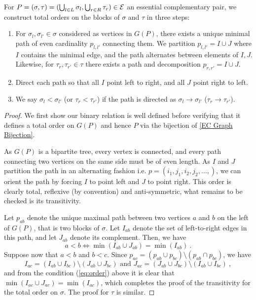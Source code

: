 \begin{construction} 
\label{Order Lemma}
For $P=(\sigma,\tau) = (\bigcup_{l\in L}\sigma_l,\bigcup_{r\in R} \tau_r) \in \mathcal{E}$ an essential complementary pair, we construct total orders on the blocks of $\sigma$ and $\tau$ in three steps:
\begin{enumerate}
    \item For $\sigma_l,\sigma_{l'} \in \sigma$ considered as vertices in $G(P)$, there exists a unique minimal path of even cardinality $p_{l,l'}$ connecting them.
    We partition $p_{l,l'}=I\cup J$ where $I$ contains the minimal edge, and the path alternates between elements of $I,J$. Likewise, for $\tau_r,\tau_{r'}\in \tau$ there exists a path and decomposition $p_{r,r'} = I\cup J$.
    \item Direct each path so that all $I$ point left to right, and all $J$ point right to left.
    \item We say $\sigma_l< \sigma_{l'}$ (or $\tau_r < \tau_{r'}$) if the path is directed as $\sigma_l \to \sigma_{l'}$ ($\tau_r \to \tau_{r'}$).
\end{enumerate}
\end{construction}

\begin{proof}
We first show our binary relation is well defined before verifying that it defines a total order on $G(P)$ and hence $P$ via the bijection of \cref{EC Graph Bijection}.

As $G(P)$ is a bipartite tree, every vertex is connected, and every path connecting two vertices on the same side must be of even length. 
As $I$ and $J$ partition the path in an alternating fashion i.e. $p=(i_1,j_1,i_2,j_2,..., )$, we can orient the path by forcing $I$ to point left and $J$ to point right. 
This order is clearly total, reflexive (by convention) and anti-symmetric, what remains to be checked is its transitivity. 

Let $p_{ab}$ denote the unique maximal path between two vertices $a$ and $b$ on the left of $G(P)$, that is two blocks of $\sigma$. 
Let $I_{ab}$ denote the set of left-to-right edges in this path, and let $J_{ab}$ denote its complement. 
Then, we have 
\begin{equation}
    \label{eq:order}
    a < b \iff \min(I_{ab}\cup J_{ab})=\min(I_{ab}) \ . 
\end{equation}
Suppose now that $a < b$ and $b < c$.
Since $p_{ac}= (p_{ab} \cup p_{bc}) \setminus (p_{ab} \cap p_{bc})$, we have $$ I_{ac}=(I_{ab}\cup I_{bc}) \setminus (J_{ab} \cup J_{bc}) \text{ and } J_{ac}=(J_{ab}\cup J_{bc}) \setminus (I_{ab} \cup I_{bc}) \ , $$ and from the condition (\ref{eq:order}) above it is clear that $\min(I_{ac}\cup J_{ac})=\min(I_{ac})$, which completes the proof of the transitivity for the total order on $\sigma$. 
The proof for $\tau$ is similar. 
\end{proof}

